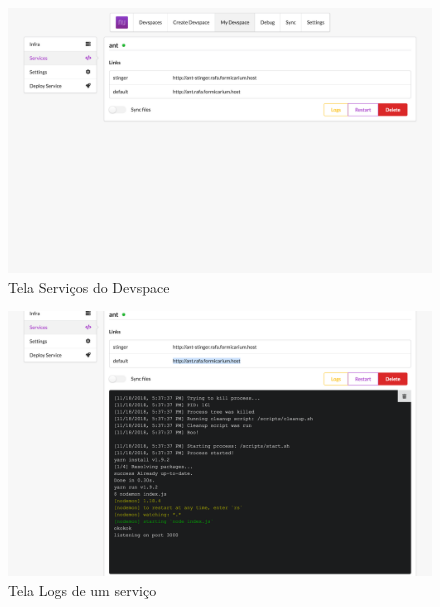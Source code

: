         \begin{figure}[htb]
        	\caption{\label{fig_frontend_devspace_services}Tela Serviços do Devspace}
        	\begin{center}
        	\includegraphics[width=\textwidth,keepaspectratio]{pictures/frontend/frontend-devspace-services.png}
        	\end{center}
        \end{figure}
        
        \begin{figure}[htb]
        	\caption{\label{fig_frontend_logs}Tela Logs de um serviço}
        	\begin{center}
        	\includegraphics[width=\textwidth,keepaspectratio]{pictures/frontend/frontend-logs.png}
        	\end{center}
        \end{figure}
    
